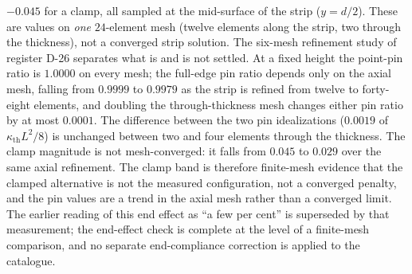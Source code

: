 $-0.045$ for a clamp, all sampled at the mid-surface of the strip ($y=d/2$). These are values on
\emph{one} $24$-element mesh (twelve elements along the strip, two through the thickness), not a
converged strip solution. The six-mesh refinement study of register D-26 separates what is and is
not settled. At a fixed height the point-pin ratio is $1.0000$ on every mesh; the full-edge pin
ratio depends only on the axial mesh, falling from $0.9999$ to $0.9979$ as the strip is refined from
twelve to forty-eight elements, and doubling the through-thickness mesh changes either pin ratio by
at most $0.0001$. The difference between the two pin idealizations ($0.0019$ of $\kappa_{\mathrm{th}}L^2/8$) is
unchanged between two and four elements through the thickness. The clamp magnitude is not
mesh-converged: it falls from $0.045$ to $0.029$ over the same axial refinement. The clamp band is
therefore finite-mesh evidence that the clamped alternative is not the measured configuration, not a
converged penalty, and the pin values are a trend in the axial mesh rather than a converged limit. The earlier reading of this end effect as ``a few per cent''
is superseded by that measurement; the end-effect check is complete at the level of a finite-mesh
comparison, and no separate end-compliance correction is applied to the catalogue.

